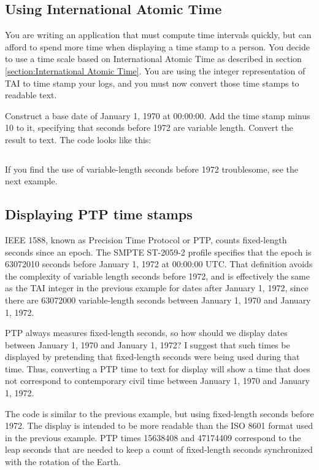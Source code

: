 \documentclass[letterpaper,twoside]{article}
\begin{document}
\subsection{Using International Atomic Time}
\label{example:TAI}
You are writing an application that must compute time intervals quickly,
but can afford to spend more time when displaying a time stamp to a person.
You decide to use a time scale based on International Atomic Time as described
in section \ref{section:International Atomic Time}.  You are using the
integer representation of TAI to time stamp your logs, and you must now convert
those time stamps to readable text.

Construct a base date of January 1, 1970 at 00:00:00.  Add the time stamp
minus 10 to it, specifying that seconds before 1972 are variable length.
Convert the result to text.  The code looks like this:
\inputminted[firstline=41,lastline=67]{c}{examples/example_04.c}

If you find the use of variable-length seconds before 1972 troublesome,
see the next example.

\subsection{Displaying PTP time stamps}
\label{example:PTP}
IEEE 1588, known as Precision Time Protocol or PTP, counts fixed-length
seconds since an epoch.  The SMPTE ST-2059-2 profile specifies that the epoch is
\num{63072010} seconds before January 1, 1972 at 00:00:00 UTC.  That definition
avoids the complexity of variable length seconds before 1972, and is
effectively the same as the TAI integer in the previous example
for dates after January 1, 1972, since there are \num{63072000}
variable-length seconds between January 1, 1970 and January 1, 1972.

PTP always measures fixed-length seconds, so how should we display
dates between January 1, 1970 and January 1, 1972?  I suggest that
such times be displayed by pretending that fixed-length seconds
were being used during that time.  Thus, converting a PTP time
to text for display will show a time that does not correspond to
contemporary civil time between January 1, 1970 and January 1, 1972.

The code is similar to the previous example, but using
fixed-length seconds before 1972.  The display is intended to be
more readable than the ISO 8601 format used in the previous example.
PTP times \num{15638408} and \num{47174409} correspond to the leap
seconds that are needed to keep a count of fixed-length seconds
synchronized with the rotation of the Earth.
\end{document}
